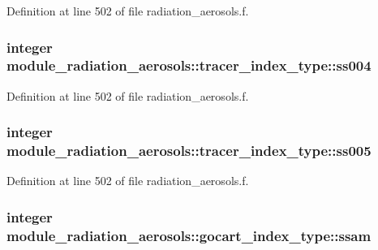 Definition at line 502 of file radiation\+\_\+aerosols.\+f.

\subsubsection[{\texorpdfstring{ss004}{ss004}}]{\setlength{\rightskip}{0pt plus 5cm}integer module\+\_\+radiation\+\_\+aerosols\+::tracer\+\_\+index\+\_\+type\+::ss004\hspace{0.3cm}{\ttfamily [private]}}\hypertarget{group__module__radiation__aerosols_ga88d0024b6f7f6fa3ae4e1da0e9ce7db8}{}\label{group__module__radiation__aerosols_ga88d0024b6f7f6fa3ae4e1da0e9ce7db8}


Definition at line 502 of file radiation\+\_\+aerosols.\+f.

\subsubsection[{\texorpdfstring{ss005}{ss005}}]{\setlength{\rightskip}{0pt plus 5cm}integer module\+\_\+radiation\+\_\+aerosols\+::tracer\+\_\+index\+\_\+type\+::ss005\hspace{0.3cm}{\ttfamily [private]}}\hypertarget{group__module__radiation__aerosols_ga3c67144cb8aeedfb6c51c474a5072605}{}\label{group__module__radiation__aerosols_ga3c67144cb8aeedfb6c51c474a5072605}


Definition at line 502 of file radiation\+\_\+aerosols.\+f.

\subsubsection[{\texorpdfstring{ssam}{ssam}}]{\setlength{\rightskip}{0pt plus 5cm}integer module\+\_\+radiation\+\_\+aerosols\+::gocart\+\_\+index\+\_\+type\+::ssam\hspace{0.3cm}{\ttfamily [private]}}\hypertarget{group__module__radiation__aerosols_ga911c3dc2e5722a38166950003a4d0875}{}\label{group__module__radiation__aerosols_ga911c3dc2e5722a38166950003a4d0875}


